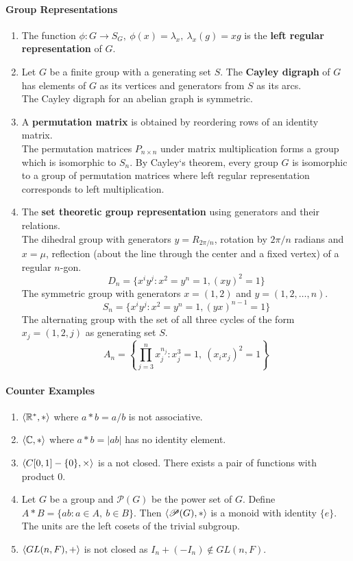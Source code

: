 \paragraph{Group Representations}
\begin{enumerate}
	\item The function $\phi : G \to S_G,\ \phi(x)=\lambda_x,\ \lambda_x(g) = xg$ is the \textbf{left regular representation} of $G$.
	\item Let $G$ be a finite group with a generating set $S$. The \textbf{Cayley digraph} of $G$ has elements of $G$ as its vertices and generators from $S$ as its arcs.\\
	The Cayley digraph for an abelian graph is symmetric.
	\item A \textbf{permutation matrix} is obtained by reordering rows of an identity matrix.\\
	The permutation matrices $P_{n \times n}$ under matrix multiplication forms a group which is isomorphic to $S_n$. By Cayley`s theorem, every group $G$ is isomorphic to a group of permutation matrices where left regular representation corresponds to left multiplication.
	\item The \textbf{set theoretic group representation} using generators and their relations.\\
	The dihedral group with generators $y=R_{2\pi/n}$, rotation by $2\pi/n$ radians and $x=\mu$, reflection (about the line through the center and a fixed vertex) of a regular $n$-gon.
	$$D_n = \{ x^iy^j : x^2=y^n=1, (xy)^2=1 \}$$
	The symmetric group with generators $x=(1,2)$ and $y=(1,2,\dots,n)$. 
	$$S_n = \{ x^iy^j : x^2=y^n=1,(yx)^{n-1}=1 \}$$
	The alternating group with the set of all three cycles of the form $x_j = (1,2,j)$ as generating set $S$.
	$$A_n = \left\{ \prod_{j=3}^n x_j^{n_j} : x_j^3=1,\ (x_ix_j)^2=1\right\}$$
\end{enumerate}
\paragraph{Counter Examples}
\begin{enumerate}
	\item $\left\langle \mathbb{R}^\ast,\ast \right\rangle$ where $a \ast b = a/b$ is not associative.
	\item $\left\langle \mathbb{C},\ast \right\rangle$ where $a \ast b = |ab|$ has no identity element.
	\item $\left\langle C[0,1]-\{0\},\times \right\rangle$ is a not closed. There exists a pair of functions with product $0$.
	\item Let $G$ be a group and $\mathscr{P}(G)$ be the power set of $G$. Define $A \ast B = \{ ab : a \in A,\ b \in B \}$. Then $\left\langle \mathscr{P}(G),\ast \right\rangle$ is a monoid with identity $\{ e \}$. The units are the left cosets of the trivial subgroup.
	\item $\left\langle GL(n,F),+ \right\rangle$ is not closed as $I_n+(-I_n) \notin GL(n,F)$.
\end{enumerate}

